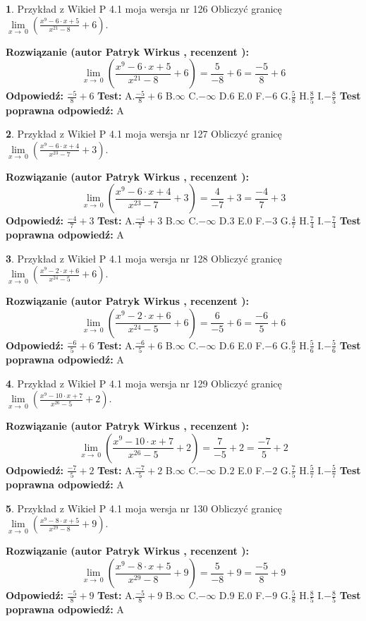 \documentclass[12pt, a4paper]{article}
\theoremstyle{definition} %
\newtheorem{zad}{}
\newcommand{\zadStart}[1]{\begin{zad}#1\newline}
\newcommand{\zadStop}{\end{zad}}
\newcommand{\rozwStart}[2]{\noindent \textbf{Rozwiązanie (autor #1 , recenzent #2): }\newline}
\newcommand{\rozwStop}{\newline}
\newcommand{\odpStart}{\noindent \textbf{Odpowiedź:}\newline}
\newcommand{\odpStop}{\newline}
\newcommand{\testStart}{\noindent \textbf{Test:}\newline}
\newcommand{\testStop}{\newline}
\newcommand{\kluczStart}{\noindent \textbf{Test poprawna odpowiedź:}\newline}
\newcommand{\kluczStop}{\newline}
\begin{document}
\zadStart{Przykład z Wikieł P 4.1 moja wersja nr 126}
Obliczyć granicę $\lim\limits_{x\to\ 0}(\frac{x^{9}-6 \cdot x +5}{x^{21}-8}+6)$.
\zadStop
\rozwStart{Patryk Wirkus}{}
$$\lim\limits_{x\to\ 0}(\frac{x^{9}-6 \cdot x +5}{x^{21}-8}+6)=\frac{5}{-8}+6=\frac{-5}{8}+6$$
\rozwStop
\odpStart
$\frac{-5}{8}+6$
\odpStop
\testStart
A.$\frac{-5}{8}+6$
B.$\infty$
C.$-\infty$
D.$6$
E.$0$
F.$-6$
G.$\frac{5}{8}$
H.$\frac{8}{5}$
I.$-\frac{8}{5}$
\testStop
\kluczStart
A
\kluczStop



\zadStart{Przykład z Wikieł P 4.1 moja wersja nr 127}
Obliczyć granicę $\lim\limits_{x\to\ 0}(\frac{x^{9}-6 \cdot x +4}{x^{23}-7}+3)$.
\zadStop
\rozwStart{Patryk Wirkus}{}
$$\lim\limits_{x\to\ 0}(\frac{x^{9}-6 \cdot x +4}{x^{23}-7}+3)=\frac{4}{-7}+3=\frac{-4}{7}+3$$
\rozwStop
\odpStart
$\frac{-4}{7}+3$
\odpStop
\testStart
A.$\frac{-4}{7}+3$
B.$\infty$
C.$-\infty$
D.$3$
E.$0$
F.$-3$
G.$\frac{4}{7}$
H.$\frac{7}{4}$
I.$-\frac{7}{4}$
\testStop
\kluczStart
A
\kluczStop



\zadStart{Przykład z Wikieł P 4.1 moja wersja nr 128}
Obliczyć granicę $\lim\limits_{x\to\ 0}(\frac{x^{9}-2 \cdot x +6}{x^{24}-5}+6)$.
\zadStop
\rozwStart{Patryk Wirkus}{}
$$\lim\limits_{x\to\ 0}(\frac{x^{9}-2 \cdot x +6}{x^{24}-5}+6)=\frac{6}{-5}+6=\frac{-6}{5}+6$$
\rozwStop
\odpStart
$\frac{-6}{5}+6$
\odpStop
\testStart
A.$\frac{-6}{5}+6$
B.$\infty$
C.$-\infty$
D.$6$
E.$0$
F.$-6$
G.$\frac{6}{5}$
H.$\frac{5}{6}$
I.$-\frac{5}{6}$
\testStop
\kluczStart
A
\kluczStop



\zadStart{Przykład z Wikieł P 4.1 moja wersja nr 129}
Obliczyć granicę $\lim\limits_{x\to\ 0}(\frac{x^{9}-10 \cdot x +7}{x^{26}-5}+2)$.
\zadStop
\rozwStart{Patryk Wirkus}{}
$$\lim\limits_{x\to\ 0}(\frac{x^{9}-10 \cdot x +7}{x^{26}-5}+2)=\frac{7}{-5}+2=\frac{-7}{5}+2$$
\rozwStop
\odpStart
$\frac{-7}{5}+2$
\odpStop
\testStart
A.$\frac{-7}{5}+2$
B.$\infty$
C.$-\infty$
D.$2$
E.$0$
F.$-2$
G.$\frac{7}{5}$
H.$\frac{5}{7}$
I.$-\frac{5}{7}$
\testStop
\kluczStart
A
\kluczStop



\zadStart{Przykład z Wikieł P 4.1 moja wersja nr 130}
Obliczyć granicę $\lim\limits_{x\to\ 0}(\frac{x^{9}-8 \cdot x +5}{x^{29}-8}+9)$.
\zadStop
\rozwStart{Patryk Wirkus}{}
$$\lim\limits_{x\to\ 0}(\frac{x^{9}-8 \cdot x +5}{x^{29}-8}+9)=\frac{5}{-8}+9=\frac{-5}{8}+9$$
\rozwStop
\odpStart
$\frac{-5}{8}+9$
\odpStop
\testStart
A.$\frac{-5}{8}+9$
B.$\infty$
C.$-\infty$
D.$9$
E.$0$
F.$-9$
G.$\frac{5}{8}$
H.$\frac{8}{5}$
I.$-\frac{8}{5}$
\testStop
\kluczStart
A
\kluczStop
\end{document}
